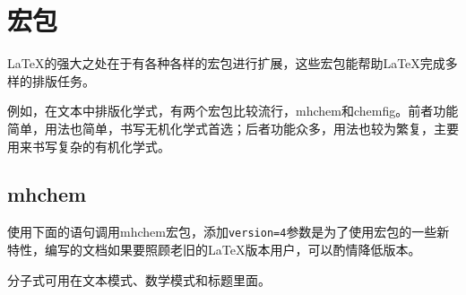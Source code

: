 \newpage
\chapter{宏包}
\thispagestyle{chapterpage}

\LaTeX{}的强大之处在于有各种各样的宏包进行扩展，这些宏包能帮助\LaTeX{}完成多样的排版任务。

例如，在文本中排版化学式，有两个宏包比较流行，mhchem和chemfig。前者功能简单，用法也简单，书写无机化学式首选；后者功能众多，用法也较为繁复，主要用来书写复杂的有机化学式。

\section{mhchem}

使用下面的语句调用mhchem宏包，添加\lstinline|version=4|参数是为了使用宏包的一些新特性，编写的文档如果要照顾老旧的\LaTeX 版本用户，可以酌情降低版本。

\begin{latex}
\usepackage[version=4]{mhchem}
\end{latex}


\begin{codeshow}
\par
{}
\end{codeshow}


分子式可用在文本模式、数学模式和标题里面。

\begin{codeshow}
\par
{}
 \end{codeshow}


\begin{codeshow}
\par
{}\par
\ce{[AgCl2]-}\par
{}\par
{}
\end{codeshow}


\begin{codeshow}
\end{codeshow}


\begin{codeshow}
\par
{}\par
{}\par
{}\par
{}\par
{}
\end{codeshow}

